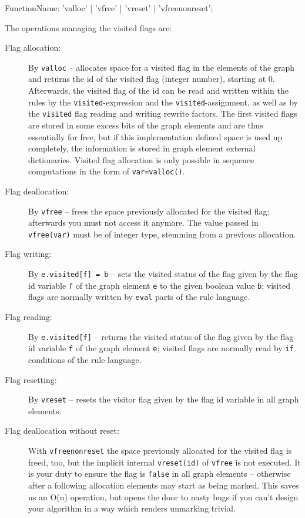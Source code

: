 \begin{rail}
  FunctionName: 'valloc' | 'vfree' | 'vreset' | 'vfreenonreset';
\end{rail}

The operations managing the visited flags are:
\begin{description}
\item[Flag allocation:] By \texttt{valloc}\label{allocvisitflag} -- allocates space for a visited flag in the elements of the graph and returns the id of the visited flag (integer number), starting at 0.
Afterwards, the visited flag of the id can be read and written within the rules by the \texttt{visited}-expression and the \texttt{visited}-assignment,
as well as by the \texttt{visited} flag reading and writing rewrite factors.
The first visited flags are stored in some excess bits of the graph elements and are thus essentially for free,
but if this implementation defined space is used up completely, the information is stored in graph element external dictionaries.
Visited flag allocation is only possible in sequence computations in the form of \texttt{var=valloc()}.
\item[Flag deallocation:] By \texttt{vfree} -- frees the space previously allocated for the visited flag; afterwards you must not access it anymore.
The value passed in \texttt{vfree(var)} must be of integer type, stemming from a previous allocation.
\item[Flag writing:] By \texttt{e.visited[f] = b} -- sets the visited status of the flag given by the flag id variable \texttt{f} of the graph element \texttt{e} to the given boolean value \texttt{b}; visited flags are normally written by \texttt{eval} parts of the rule language.
\item[Flag reading:] By \texttt{e.visited[f]} -- returns the visited status of the flag given by the flag id variable \texttt{f} of the graph element \texttt{e}; visited flags are normally read by \texttt{if} conditions of the rule language.
\item[Flag resetting:] By \texttt{vreset} -- resets the visitor flag given by the flag id variable in all graph elements.
\item[Flag deallocation without reset:] With \texttt{vfreenonreset} the space previously allocated for the visited flag is freed, too, but the implicit internal \texttt{vreset(id)} of \texttt{vfree} is not executed. It is your duty to ensure the flag is \texttt{false} in all graph elements -- otherwise after a following allocation elements may start as being marked. This saves us an O(n) operation, but opens the door to nasty bugs if you can't design your algorithm in a way which renders unmarking trivial.
\end{description}


